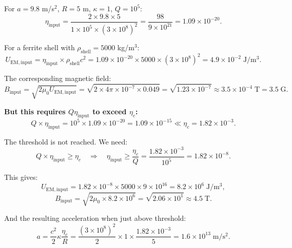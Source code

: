 \documentclass[12pt, letterpaper]{article}
\theoremstyle{definition}
\theoremstyle{remark}
\newcommand{\etac}{\eta_c}
\begin{document}
For $a = 9.8$ m/s$^2$, $R = 5$ m, $\kappa = 1$, $Q = 10^5$:
\begin{equation}
\eta_{\mathrm{input}} = \frac{2 \times 9.8 \times 5}{1 \times 10^5 \times (3 \times 10^8)^2}
= \frac{98}{9 \times 10^{21}}
= 1.09 \times 10^{-20}.
\end{equation}

For a ferrite shell with $\rho_{\mathrm{shell}} = 5000$ kg/m$^3$:
\begin{equation}
U_{\mathrm{EM,input}} = \eta_{\mathrm{input}} \times \rho_{\mathrm{shell}} c^2
= 1.09 \times 10^{-20} \times 5000 \times (3 \times 10^8)^2
= 4.9 \times 10^{-2} \; \mathrm{J/m^3}.
\end{equation}

The corresponding magnetic field:
\begin{equation}
B_{\mathrm{input}} = \sqrt{2\mu_0 U_{\mathrm{EM,input}}}
= \sqrt{2 \times 4\pi \times 10^{-7} \times 0.049}
= \sqrt{1.23 \times 10^{-7}}
\approx 3.5 \times 10^{-4} \; \mathrm{T}
= 3.5 \; \mathrm{G}.
\end{equation}

\textbf{But this requires $Q\eta_{\mathrm{input}}$ to exceed $\etac$:}
\begin{equation}
Q \times \eta_{\mathrm{input}} = 10^5 \times 1.09 \times 10^{-20}
= 1.09 \times 10^{-15} \ll \etac = 1.82 \times 10^{-3}.
\end{equation}

The threshold is not reached. We need:
\begin{equation}
Q \times \eta_{\mathrm{input}} \geq \etac
\quad \Rightarrow \quad
\eta_{\mathrm{input}} \geq \frac{\etac}{Q} = \frac{1.82 \times 10^{-3}}{10^5}
= 1.82 \times 10^{-8}.
\end{equation}

This gives:
\begin{equation}
U_{\mathrm{EM,input}} = 1.82 \times 10^{-8} \times 5000 \times 9 \times 10^{16}
= 8.2 \times 10^{6} \; \mathrm{J/m^3},
\end{equation}
\begin{equation}
B_{\mathrm{input}} = \sqrt{2\mu_0 \times 8.2 \times 10^6}
= \sqrt{2.06 \times 10^{1}}
\approx 4.5 \; \mathrm{T}.
\end{equation}

And the resulting acceleration when just above threshold:
\begin{equation}
a = \frac{c^2}{2} \kappa \frac{\etac}{R}
= \frac{(3 \times 10^8)^2}{2} \times 1 \times \frac{1.82 \times 10^{-3}}{5}
= 1.6 \times 10^{13} \; \mathrm{m/s^2}.
\end{equation}
\end{document}
